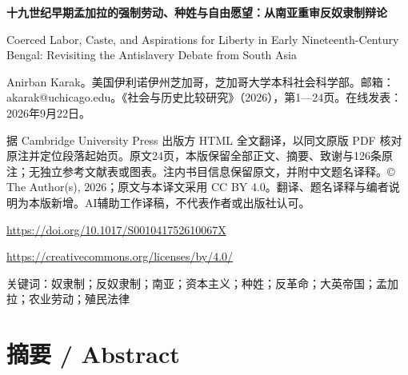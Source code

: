 \documentclass[10pt,a4paper]{article}
\begin{document}
{\Large\bfseries 十九世纪早期孟加拉的强制劳动、种姓与自由愿望：从南亚重审反奴隶制辩论\par}\medskip
Coerced Labor, Caste, and Aspirations for Liberty in Early Nineteenth-Century Bengal: Revisiting the Antislavery Debate from South Asia\par
Anirban Karak。美国伊利诺伊州芝加哥，芝加哥大学本科社会科学部。邮箱：akarak@uchicago.edu。《社会与历史比较研究》（2026），第1—24页。在线发表：2026年9月22日。\par
据 Cambridge University Press 出版方 HTML 全文翻译，以同文原版 PDF 核对原注并定位段落起始页。原文24页，本版保留全部正文、摘要、致谢与126条原注；无独立参考文献表或图表。注内书目信息保留原文，并附中文题名译释。© The Author(s), 2026；原文与本译文采用 CC BY 4.0。翻译、题名译释与编者说明为本版新增。AI辅助工作译稿，不代表作者或出版社认可。\par
\url{https://doi.org/10.1017/S001041752610067X}\par
\url{https://creativecommons.org/licenses/by/4.0/}\par
关键词：奴隶制；反奴隶制；南亚；资本主义；种姓；反革命；大英帝国；孟加拉；农业劳动；殖民法律\par\bigskip
{}\section*{摘要 / Abstract}
\end{document}
